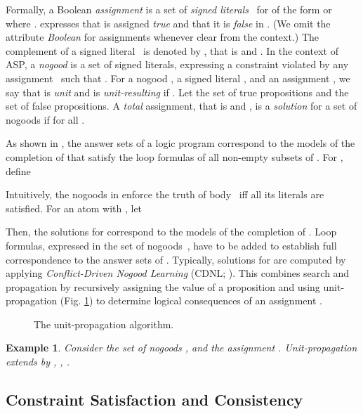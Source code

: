 \documentclass{tlp}
\newtheorem{example}{Example}
\begin{document}
Formally, a Boolean \emph{assignment}  is a set  of \emph{signed literals}~ for  of the form  or  where .  expresses that  is assigned \emph{true} and  that it is \emph{false} in . (We omit the attribute \emph{Boolean} for assignments whenever clear from the context.) The complement of a signed literal~ is denoted by , that is  and .
In the context of ASP, a \emph{nogood} \cite{dechter03} is a set  of signed literals, expressing a constraint violated by any assignment~ such that .
For a nogood , a signed literal , and an assignment , we say that  is \emph{unit} and  is \emph{unit-resulting} if .
Let  the set of true propositions and  the set of false propositions. A \emph{total} assignment, that is  and , is a \emph{solution} for a set  of nogoods if  for all .

As shown in , the answer sets of a logic program  correspond to the models of the completion of  that satisfy the loop formulas of all non-empty subsets of . For , define

Intuitively, the nogoods in  enforce the truth of body~ iff all its literals are satisfied.
For an atom  with , let

Then, the solutions for  correspond to the models of the completion of . Loop formulas, expressed in the set of nogoods~, have to be added to establish full correspondence to the answer sets of .
Typically, solutions for  are computed by applying \emph{Conflict-Driven Nogood Learning} (CDNL; ). This combines search and propagation by recursively assigning the value of a proposition and using unit-propagation (Fig. \ref{alg:up}) to determine logical consequences of an assignment \cite{mitchell05a}.
\begin{figure}
\figrule


\figrule
\vspace{-1\baselineskip}
\caption{The unit-propagation algorithm.}\label{alg:up}
\end{figure}
\begin{example}
Consider the set of nogoods ,  and the assignment . Unit-propagation extends  by , , .
\end{example}


\subsection{Constraint Satisfaction and Consistency}
\end{document}
